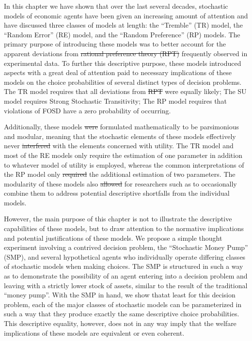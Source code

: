 \documentclass[11pt,a4paper]{report}
\providecommand{\DIFaddtex}[1]{{\protect\color{blue}\uwave{#1}}} %
\providecommand{\DIFdeltex}[1]{{\protect\color{red}\sout{#1}}}                      %
\providecommand{\DIFaddbegin}{} %
\providecommand{\DIFaddend}{} %
\providecommand{\DIFdelbegin}{} %
\providecommand{\DIFdelend}{} %
\providecommand{\DIFadd}[1]{\texorpdfstring{\DIFaddtex{#1}}{#1}} %
\providecommand{\DIFdel}[1]{\texorpdfstring{\DIFdeltex{#1}}{}} %
\newcommand{\DIFscaledelfig}{0.5}
\newlength{\DIFdelgraphicswidth} %
\newlength{\DIFdelgraphicsheight} %
\newcommand{\DIFaddincludegraphics}[2][]{{\color{blue}\fbox{\DIFOincludegraphics[#1]{#2}}}} %
\newcommand{\DIFdelincludegraphics}[2][]{%
\sbox{\DIFdelgraphicsbox}{\DIFOincludegraphics[#1]{#2}}%
\settoboxwidth{\DIFdelgraphicswidth}{\DIFdelgraphicsbox} %
\settoboxtotalheight{\DIFdelgraphicsheight}{\DIFdelgraphicsbox} %
\scalebox{\DIFscaledelfig}{%
\parbox[b]{\DIFdelgraphicswidth}{\usebox{\DIFdelgraphicsbox}\\[-\baselineskip] \rule{\DIFdelgraphicswidth}{0em}}\llap{\resizebox{\DIFdelgraphicswidth}{\DIFdelgraphicsheight}{%
\setlength{\unitlength}{\DIFdelgraphicswidth}%
\begin{picture}(1,1)%
\thicklines\linethickness{2pt} %
{\color[rgb]{1,0,0}\put(0,0){\framebox(1,1){}}}%
{\color[rgb]{1,0,0}\put(0,0){\line( 1,1){1}}}%
{\color[rgb]{1,0,0}\put(0,1){\line(1,-1){1}}}%
\end{picture}%
}\hspace*{3pt}}} %
} %
\DeclareRobustCommand{\DIFaddbegin}{\DIFOaddbegin \let\includegraphics\DIFaddincludegraphics} %
\DeclareRobustCommand{\DIFaddend}{\DIFOaddend \let\includegraphics\DIFOincludegraphics} %
\DeclareRobustCommand{\DIFdelbegin}{\DIFOdelbegin \let\includegraphics\DIFdelincludegraphics} %
\DeclareRobustCommand{\DIFdelend}{\DIFOaddend \let\includegraphics\DIFOincludegraphics} %
\begin{document}
In this chapter we have shown that over the last several decades, stochastic models of economic agents have been given an increasing amount of attention and have discussed three classes of models at length: the \enquote{Tremble} (TR) model, the \enquote{Random Error} (RE) model, and the \enquote{Random Preference} (RP) models.
The primary purpose of introducing these models was to better account for the apparent deviations from \DIFdelbegin \DIFdel{rational preference theory (RPT) }\DIFdelend \DIFaddbegin \DIFadd{EUT }\DIFaddend frequently observed in experimental data.
To further this descriptive purpose, these models introduced aspects with a great deal of attention paid to necessary implications of these models on the choice probabilities of several distinct types of decision problems.
The TR model requires that all deviations from \DIFdelbegin \DIFdel{RPT }\DIFdelend \DIFaddbegin \DIFadd{EUT }\DIFaddend were equally likely;
The SU model requires Strong Stochastic Transitivity;
The RP model requires that violations of FOSD have a zero probability of occurring.

Additionally, these models \DIFdelbegin \DIFdel{were }\DIFdelend \DIFaddbegin \DIFadd{are }\DIFaddend formulated mathematically to be parsimonious and modular, meaning that the stochastic elements of these models effectively never \DIFdelbegin \DIFdel{interfered }\DIFdelend \DIFaddbegin \DIFadd{interfere }\DIFaddend with the elements concerned with utility.
The TR model and most of the RE models only require the estimation of one parameter in addition to whatever model of utility is employed, whereas the common interpretations of the RP model only \DIFdelbegin \DIFdel{required }\DIFdelend \DIFaddbegin \DIFadd{require }\DIFaddend the additional estimation of two parameters.
The modularity of these models also \DIFdelbegin \DIFdel{allowed }\DIFdelend \DIFaddbegin \DIFadd{allows }\DIFaddend for researchers such as \textcite{Loomes2002} to occasionally combine them to address potential descriptive shortfalls from the individual models.

However, the main purpose of this chapter is not to illustrate the descriptive capabilities of these models, but to draw attention to the normative implications and potential justifications of these models.
We propose a simple thought experiment involving a contrived decision problem, the \enquote{Stochastic Money Pump} (SMP), and several hypothetical agents who individually operate differing classes of stochastic models when making choices.
The SMP is structured in such a way as to demonstrate the possibility of an agent entering into a decision problem and leaving with a strictly lower stock of assets, similar to the result of the traditional \enquote{money pump}.
With the SMP in hand, we show that\DIFaddbegin \DIFadd{, }\DIFaddend at least for this decision problem, each of the major classes of stochastic models can be parameterized in such a way that they produce exactly the same descriptive choice probabilities.
This descriptive equality, however, does not in any way imply that the welfare implications of these models are equivalent or even coherent.
\end{document}
